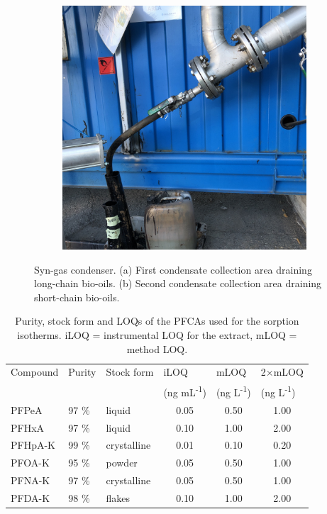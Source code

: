 \begin{figure}
\begin{subfigure}[b]{0.3\linewidth}
         \centering
         \includegraphics[width=\linewidth]{Bilder/Pyrolysis/CondensateCollection2.jpg}
         \caption{}
         \label{fig:condensate2}
     \end{subfigure}
        \caption{Syn-gas condenser. (a) First condensate collection area draining long-chain bio-oils. (b) Second condensate collection area draining short-chain bio-oils.}
        \label{fig:condenser}
\end{figure}

\begin{table}
    \centering
    \caption{Purity, stock form and LOQs of the PFCAs used for the sorption isotherms. iLOQ = instrumental LOQ for  the extract, mLOQ = method LOQ.}
    \label{tab:PFCAform&LOQ}
    \begin{tabular}{@{}lllccc@{}}
    \toprule
    \multicolumn{1}{l}{Compound}  & \multicolumn{1}{l}{Purity}  & \multicolumn{1}{l}{Stock form} & \multicolumn{1}{l}{iLOQ} & \multicolumn{1}{l}{mLOQ}  & \multicolumn{1}{l}{2$\times$mLOQ}\\ 
    & & & \multicolumn{1}{l}{(ng mL\textsuperscript{-1})}  & \multicolumn{1}{l}{(ng L\textsuperscript{-1})}  & \multicolumn{1}{l}{(ng L\textsuperscript{-1})} \\ \midrule
     PFPeA  & 97 \%   & liquid    & 0.05 & 0.50  & 1.00     \\
     PFHxA  & 97 \%   & liquid    & 0.10 & 1.00   & 2.00     \\
     PFHpA-K  & 99 \%   & crystalline & 0.01 & 0.10   & 0.20    \\
     PFOA-K   & 95 \%   & powder    & 0.05 & 0.50    & 1.00   \\
     PFNA-K   & 97 \%    & crystalline  & 0.05 & 0.50 & 1.00   \\
     PFDA-K   & 98 \% & flakes & 0.10 & 1.00 & 2.00  \\ \bottomrule
    \end{tabular}
\end{table}

